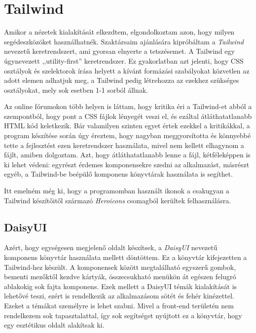 \documentclass[
]{thesis-ekf}
\theoremstyle{definition}
\theoremstyle{remark}
\begin{document}
 

\section{Tailwind}

Amikor a nézetek kialakítását elkezdtem, elgondolkoztam azon, hogy milyen segédeszközöket használhatnék. Szaktársaim ajánlására kipróbáltam a \emph{Tailwind} nevezetű keretrendszert, ami gyorsan elnyerte a tetszésemet. A Tailwind egy  úgynevezett ,,utility-first'' keretrendszer.\cite{tailwind} Ez gyakorlatban azt jelenti, hogy CSS osztályok és szelektorok írása helyett a kívánt formázási szabályokat közvetlen az adott elemen adhatjuk meg, a Tailwind pedig létrehozza az ezekhez szükséges osztályokat, mely sok esetben 1-1 sorból állnak. 



Az online fórumokon több helyen is láttam, hogy kritika éri a Tailwind-et abból a szempontból, hogy pont a CSS fájlok lényegét veszi el, és ezáltal átláthatatlanabb HTML kód keletkezik. Bár valamilyen szinten egyet értek ezekkel a kritikákkal, a program készítése során úgy éreztem, hogy nagyban meggyorsította és könnyebbé tette a fejlesztést ezen keretrendszer használata, mivel nem kellett elhagynom a fájlt, amiben dolgoztam. Azt, hogy átláthatatlanabb lenne a fájl, kétféleképpen is ki lehet védeni: egyrészt érdemes komponensekre szedni az alkalmazást, másrészt egyéb, a Tailwind-be beépülő komponens könyvtárak használata is segíthet.

Itt emelném még ki, hogy a programomban használt ikonok a csakugyan a Tailwind készítőitől származó \emph{Heroicons}\cite{heroicons} csomagból kerültek felhasználásra.

\subsection{DaisyUI}

Azért, hogy egységesen megjelenő oldalt készítsek, a \emph{DaisyUI}\cite{daisyui} nevezetű komponens könyvtár használata mellett döntöttem. Ez a könyvtár kifejezetten a Tailwind-hez készült. A komponensek között megtalálható egyszerű gombok, bementi mezőktől kezdve kártyák, összecsukható menükön át egészen felugró ablakokig sok fajta komponens. Ezek mellett a DaisyUI témák kialakítását is lehetővé teszi, ezért is rendelkezik az alkalmazásom sötét és fehér kinézettel. Ezeket a témákat személyre is lehet szabni. Mivel a front-end területén nem rendelkezem sok tapasztalattal, így sok segítséget nyújtott ez a könyvtár, hogy egy esztétikus oldalt alakítsak ki.
\end{document}
